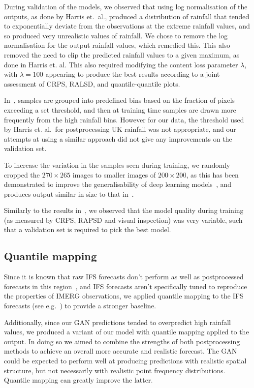 \documentclass{article}
\begin{document}
During validation of the models, we observed that using log normalisation of the outputs, as done by Harris et.~al., produced a distribution of rainfall that tended to exponentially deviate from the observations at the extreme rainfall values, and so produced very unrealistic values of rainfall. We chose to remove the log normalisation for the output rainfall values, which remedied this. This also removed the need to clip the predicted rainfall values to a given maximum, as done in Harris et. al. This also required modifying the content loss parameter $\lambda$, with $\lambda=100$ appearing to produce the best results according to a joint assessment of CRPS, RALSD, and quantile-quantile plots.

In~\cite{harris_generative_2022}, samples are grouped into predefined bins based on the fraction of pixels exceeding a set threshold, and then at training time samples are drawn more frequently from the high rainfall bins. However for our data, the threshold used by Harris et. al.~for postprocessing UK rainfall was not appropriate, and our attempts at using a similar approach did not give any improvements on the validation set.


To increase the variation in the samples seen during training, we randomly cropped the $270 \times 265$ images to smaller images of $200 \times 200$, as this has been demonstrated to improve the generalisability of deep learning models~\citep{goodfellow_deep_2016}, and produces output similar in size to that in~\cite{harris_generative_2022}.


Similarly to the results in~\cite{harris_generative_2022}, we observed that the model quality during training (as measured by CRPS, RAPSD and visual inspection) was very variable, such that a validation set is required to pick the best model. 

\subsection{Quantile mapping}
\label{subsec:qm}
Since it is known that raw IFS forecasts don't perform as well as postprocessed forecasts in this region~\citep{vogel_skill_2018}, and IFS forecasts aren't specifically tuned to reproduce the properties of IMERG observations, we applied quantile mapping to the IFS forecasts (see e.g.~\cite{maraun_model_2017}) to provide a stronger baseline. 

Additionally, since our GAN predictions tended to overpredict high rainfall values, we produced a variant of our model with quantile mapping applied to the output. In doing so we aimed to combine the strengths of both postprocessing methods to achieve an overall more accurate and realistic forecast. The GAN could be expected to perform well at producing predictions with realistic spatial structure, but not necessarily with realistic point frequency distributions. Quantile mapping can greatly improve the latter.
\end{document}
